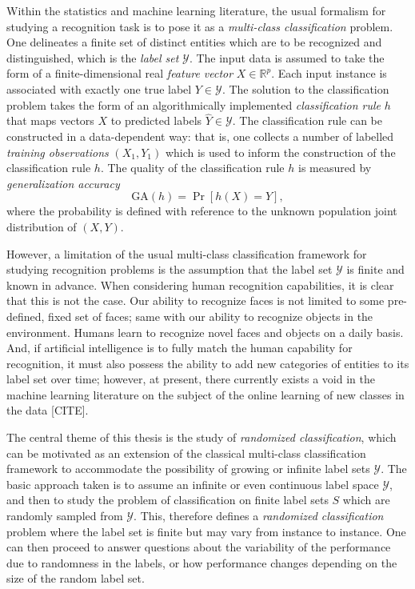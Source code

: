 Within the statistics and machine learning literature, the usual
formalism for studying a recognition task is to pose it as a
\emph{multi-class classification} problem.  One delineates a finite
set of distinct entities which are to be recognized and distinguished,
which is the \emph{label set} $\mathcal{Y}$.  The input data is
assumed to take the form of a finite-dimensional real \emph{feature
  vector} $X \in \mathbb{R}^p$.  Each input instance is associated
with exactly one true label $Y \in \mathcal{Y}$.  The solution to the
classification problem takes the form of an algorithmically
implemented \emph{classification rule} $h$ that maps vectors $X$ to
predicted labels $\hat{Y} \in \mathcal{Y}$.  The classification rule
can be constructed in a data-dependent way: that is, one collects a
number of labelled \emph{training observations} $(X_1, Y_1)$ which is
used to inform the construction of the classification rule $h$.  The
quality of the classification rule $h$ is measured by \emph{generalization accuracy}
\[
\text{GA}(h) = \Pr[h(X) = Y],
\]
where the probability is defined with reference to the unknown
population joint distribution of $(X, Y)$.  

However, a limitation of the usual multi-class classification
framework for studying recognition problems is the assumption that the
label set $\mathcal{Y}$ is finite and known in advance.  When
considering human recognition capabilities, it is clear that this is
not the case.  Our ability to recognize faces is not limited to some
pre-defined, fixed set of faces; same with our ability to recognize
objects in the environment.  Humans learn to recognize novel faces and
objects on a daily basis.  And, if artificial intelligence is to fully
match the human capability for recognition, it must also possess the
ability to add new categories of entities to its label set over time;
however, at present, there currently exists a void in the machine
learning literature on the subject of the online learning of new
classes in the data [CITE].

The central theme of this thesis is the study of \emph{randomized
  classification}, which can be motivated as an extension of the
classical multi-class classification framework to accommodate the
possibility of growing or infinite label sets $\mathcal{Y}$. The basic
approach taken is to assume an infinite or even continuous label space
$\mathcal{Y}$, and then to study the problem of classification on
finite label sets $S$ which are randomly sampled from $\mathcal{Y}.$
This, therefore defines a \emph{randomized classification} problem
where the label set is finite but may vary from instance to instance.
One can then proceed to answer questions about the variability of the
performance due to randomness in the labels, or how performance
changes depending on the size of the random label set.

